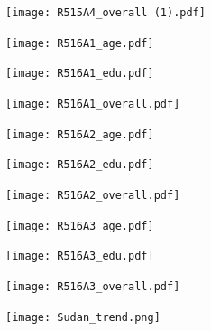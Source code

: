 \documentclass{article}
\begin{document}
\begin{figure}[H]
\centering
\caption{}
\texttt{[image: R515A4\_overall (1).pdf]}
\label{fig:my_label}
\end{figure}

\begin{figure}[H]
\centering
\caption{}
\texttt{[image: R516A1\_age.pdf]}
\label{fig:my_label}
\end{figure}

\begin{figure}[H]
\centering
\caption{}
\texttt{[image: R516A1\_edu.pdf]}
\label{fig:my_label}
\end{figure}

\begin{figure}[H]
\centering
\caption{}
\texttt{[image: R516A1\_overall.pdf]}
\label{fig:my_label}
\end{figure}

\begin{figure}[H]
\centering
\caption{}
\texttt{[image: R516A2\_age.pdf]}
\label{fig:my_label}
\end{figure}

\begin{figure}[H]
\centering
\caption{}
\texttt{[image: R516A2\_edu.pdf]}
\label{fig:my_label}
\end{figure}

\begin{figure}[H]
\centering
\caption{}
\texttt{[image: R516A2\_overall.pdf]}
\label{fig:my_label}
\end{figure}

\begin{figure}[H]
\centering
\caption{}
\texttt{[image: R516A3\_age.pdf]}
\label{fig:my_label}
\end{figure}

\begin{figure}[H]
\centering
\caption{}
\texttt{[image: R516A3\_edu.pdf]}
\label{fig:my_label}
\end{figure}

\begin{figure}[H]
\centering
\caption{}
\texttt{[image: R516A3\_overall.pdf]}
\label{fig:my_label}
\end{figure}

\begin{figure}[H]
\centering
\caption{}
\texttt{[image: Sudan\_trend.png]}
\label{fig:my_label}
\end{figure}
\end{document}
